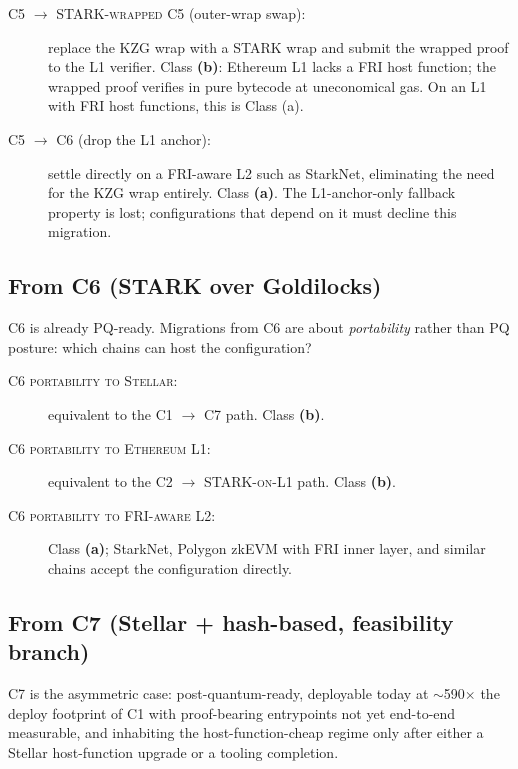 \begin{description}
  \item[\textsc{C5 $\to$ STARK-wrapped C5} (outer-wrap swap):]
    replace the KZG wrap with a STARK wrap and submit the wrapped
    proof to the L1 verifier. Class \textbf{(b)}: Ethereum L1 lacks
    a FRI host function; the wrapped proof verifies in pure bytecode
    at uneconomical gas. On an L1 with FRI host functions, this is
    Class (a).
  \item[\textsc{C5 $\to$ C6} (drop the L1 anchor):] settle directly
    on a FRI-aware L2 such as StarkNet, eliminating the need for the
    KZG wrap entirely. Class \textbf{(a)}. The L1-anchor-only
    fallback property is lost; configurations that depend on it must
    decline this migration.
\end{description}

\subsection{From C6 (STARK over Goldilocks)}
\label{sec:mig-c6}

C6 is already PQ-ready. Migrations from C6 are about
\emph{portability} rather than PQ posture: which chains can host the
configuration?

\begin{description}
  \item[\textsc{C6 portability to Stellar}:] equivalent to the
    \textsc{C1 $\to$ C7} path. Class \textbf{(b)}.
  \item[\textsc{C6 portability to Ethereum L1}:] equivalent to the
    \textsc{C2 $\to$ STARK-on-L1} path. Class \textbf{(b)}.
  \item[\textsc{C6 portability to FRI-aware L2}:] Class \textbf{(a)};
    StarkNet, Polygon zkEVM with FRI inner layer, and similar chains
    accept the configuration directly.
\end{description}

\subsection{From C7 (Stellar + hash-based, feasibility branch)}
\label{sec:mig-c7}

C7 is the asymmetric case: post-quantum-ready, deployable today at
$\sim$590$\times$ the deploy footprint of C1 with proof-bearing
entrypoints not yet end-to-end measurable, and inhabiting the
host-function-cheap regime only after either a Stellar host-function
upgrade or a tooling completion.

